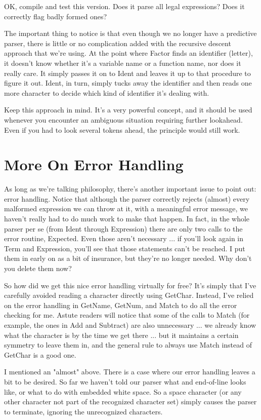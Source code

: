 \documentclass[float=false, crop=false]{standalone}
\begin{document}
OK, compile and test this version. Does it parse all legal expressions? Does it
correctly flag badly formed ones?

The important thing to notice is that even though we no longer have a predictive
parser, there is little or no complication added with the recursive descent
approach that we're using. At the point where Factor finds an identifier
(letter), it doesn't know whether it's a variable name or a function name, nor
does it really care. It simply passes it on to Ident and leaves it up to that
procedure to figure it out. Ident, in turn, simply tucks away the identifier and
then reads one more character to decide which kind of identifier it's dealing
with.

Keep this approach in mind. It's a very powerful concept, and it should be used
whenever you encounter an ambiguous situation requiring further lookahead. Even
if you had to look several tokens ahead, the principle would still work.


\section{More On Error Handling}

As long as we're talking philosophy, there's another important issue to point
out: error handling. Notice that although the parser correctly rejects (almost)
every malformed expression we can throw at it, with a meaningful error message,
we haven't really had to do much work to make that happen. In fact, in the whole
parser per se (from Ident through Expression) there are only two calls to the
error routine, Expected. Even those aren't necessary ... if you'll look again in
Term and Expression, you'll see that those statements can't be reached. I put
them in early on as a bit of insurance, but they're no longer needed. Why don't
you delete them now?

So how did we get this nice error handling virtually for free? It's simply that
I've carefully avoided reading a character directly using GetChar. Instead, I've
relied on the error handling in GetName, GetNum, and Match to do all the error
checking for me. Astute readers will notice that some of the calls to Match (for
example, the ones in Add and Subtract) are also unnecessary ... we already know
what the character is by the time we get there ... but it maintains a certain
symmetry to leave them in, and the general rule to always use Match instead of
GetChar is a good one.

I mentioned an "almost" above. There is a case where our error handling leaves a
bit to be desired. So far we haven't told our parser what and end-of-line looks
like, or what to do with embedded white space. So a space character (or any
other character not part of the recognized character set) simply causes the
parser to terminate, ignoring the unrecognized characters.
\end{document}
